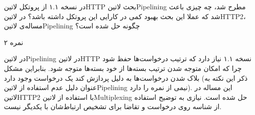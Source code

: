 
در نسخه ۱.۱ از پروتکل ‌لاتین{HTTP} بحث ‌لاتین{Pipelining} مطرح شد، چه چیزی باعث شد که عملا این بحث بهبود کمی در کارایی این پروتکل داشته باشد؟
در ‌لاتین{HTTP2}، مساله‌ی ‌لاتین{Pipelining} چگونه حل شده است؟

۲ نمره


در ‌لاتین{Pipelining} در ‌لاتین{HTTP} نسخه ۱.۱ نیاز دارد که ترتیب درخواست‌ها حفظ شود
چرا که امکان متوجه شدن ترتیب بسته‌ها از خود بسته‌ها متوجه شود.
بنابراین مشکل بلاک شدن درخواست‌ها به دلیل پردازش کند یک درخواست
وجود دارد (ذکر این نکته به عنوان دلیل عدم استفاده از ‌لاتین{Pipelining} نیمی از نمره را دارد). این مساله در ‌لاتین{HTTP2} با استفاده از ‌لاتین{Multiplexing} حل شده است.
نیازی به توضیح استفاده از شناسه روی درخواست و تقاضا برای تشخیص ارتباط‌شان با یکدیگر نیست.

